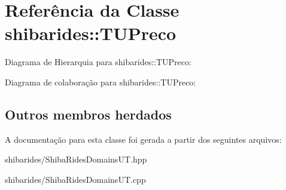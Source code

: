 \hypertarget{classshibarides_1_1TUPreco}{}\section{Referência da Classe shibarides\+:\+:T\+U\+Preco}
\label{classshibarides_1_1TUPreco}


Diagrama de Hierarquia para shibarides\+:\+:T\+U\+Preco\+:


Diagrama de colaboração para shibarides\+:\+:T\+U\+Preco\+:
\subsection*{Outros membros herdados}


A documentação para esta classe foi gerada a partir dos seguintes arquivos\+:\begin{DoxyCompactItemize}
\item 
shibarides/Shiba\+Rides\+Domains\+U\+T.\+hpp\item 
shibarides/Shiba\+Rides\+Domains\+U\+T.\+cpp\end{DoxyCompactItemize}
